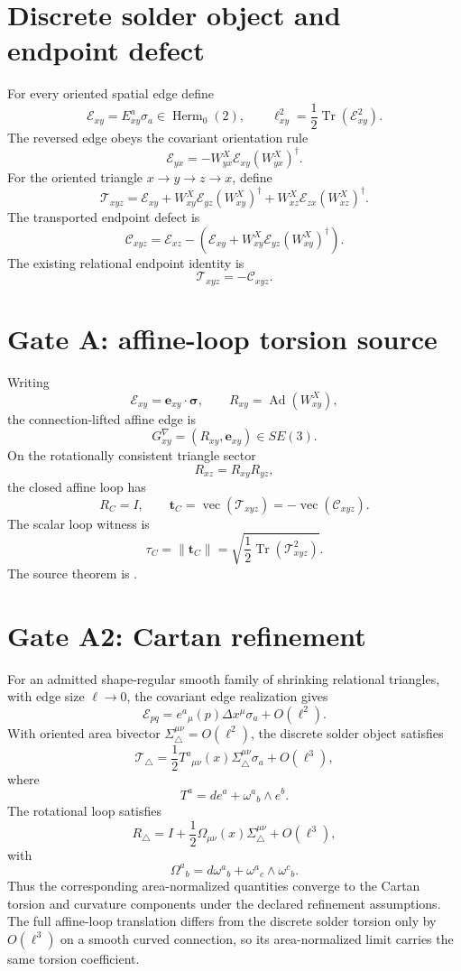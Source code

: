 \section{Discrete solder object and endpoint defect}

For every oriented spatial edge define
\[
\mathcal E_{xy}=E^a_{xy}\sigma_a\in\operatorname{Herm}_0(2),
\qquad
\ell_{xy}^2=\frac12\operatorname{Tr}(\mathcal E_{xy}^2).
\]
The reversed edge obeys the covariant orientation rule
\[
\boxed{
\mathcal E_{yx}
=-W_{yx}^{X}\mathcal E_{xy}(W_{yx}^{X})^\dagger.
}
\]
For the oriented triangle \(x\to y\to z\to x\), define
\[
\boxed{
\mathcal T_{xyz}
=\mathcal E_{xy}
+W_{xy}^{X}\mathcal E_{yz}(W_{xy}^{X})^\dagger
+W_{xz}^{X}\mathcal E_{zx}(W_{xz}^{X})^\dagger.
}
\]
The transported endpoint defect is
\[
\boxed{
\mathcal C_{xyz}
=\mathcal E_{xz}
-\left(
\mathcal E_{xy}
+W_{xy}^{X}\mathcal E_{yz}(W_{xy}^{X})^\dagger
\right).
}
\]
The existing relational endpoint identity is
\[
\boxed{\mathcal T_{xyz}=-\mathcal C_{xyz}}.
\]

\section{Gate A: affine-loop torsion source}

Writing
\[
\mathcal E_{xy}=\mathbf e_{xy}\cdot\boldsymbol\sigma,
\qquad
R_{xy}=\operatorname{Ad}(W_{xy}^{X}),
\]
the connection-lifted affine edge is
\[
\boxed{G_{xy}^{\nabla}=(R_{xy},\mathbf e_{xy})\in SE(3)}.
\]
On the rotationally consistent triangle sector
\[
R_{xz}=R_{xy}R_{yz},
\]
the closed affine loop has
\[
\boxed{R_C=I},
\qquad
\boxed{
\mathbf t_C
=\operatorname{vec}(\mathcal T_{xyz})
=-\operatorname{vec}(\mathcal C_{xyz}).
}
\]
The scalar loop witness is
\[
\boxed{
\tau_C
=\|\mathbf t_C\|
=\sqrt{\frac12\operatorname{Tr}(\mathcal T_{xyz}^2)}.
}
\]
The source theorem is
.

\section{Gate A2: Cartan refinement}

For an admitted shape-regular smooth family of shrinking relational triangles,
with edge size \(\ell\to0\), the covariant edge realization gives
\[
\mathcal E_{pq}
=e^a{}_{\mu}(p)\Delta x^{\mu}\sigma_a+O(\ell^2).
\]
With oriented area bivector \(\Sigma^{\mu\nu}_{\triangle}=O(\ell^2)\),
the discrete solder object satisfies
\[
\boxed{
\mathcal T_{\triangle}
=\frac12T^a{}_{\mu\nu}(x)
\Sigma^{\mu\nu}_{\triangle}\sigma_a
+O(\ell^3),
}
\]
where
\[
\boxed{T^a=de^a+\omega^a{}_b\wedge e^b}.
\]
The rotational loop satisfies
\[
\boxed{
R_{\triangle}
=I+\frac12\Omega_{\mu\nu}(x)
\Sigma^{\mu\nu}_{\triangle}+O(\ell^3),
}
\]
with
\[
\boxed{
\Omega^a{}_b
=d\omega^a{}_b+\omega^a{}_c\wedge\omega^c{}_b.
}
\]
Thus the corresponding area-normalized quantities converge to the Cartan
torsion and curvature components under the declared refinement assumptions.
The full affine-loop translation differs from the discrete solder torsion only
by \(O(\ell^3)\) on a smooth curved connection, so its area-normalized limit
carries the same torsion coefficient.

